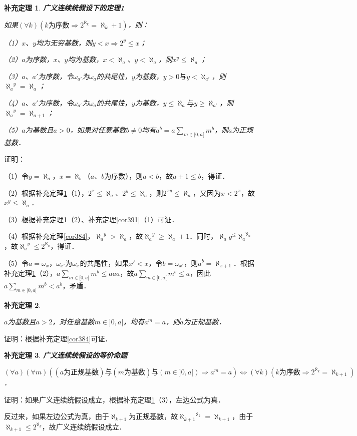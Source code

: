 \documentclass[12pt, a4paper, oneside]{book}
\newtheorem{cor}{补充定理}
\begin{document}
			\begin{cor}\label{cor392}
				\textbf{广义连续统假设下的定理1}
				\par
				如果$(\forall k)(k\text{为序数}\Rightarrow 2^{\aleph_k}=\aleph_k+1)$，则：
				\par
				（1）$x$、$y$均为无穷基数，则$y<x\Rightarrow 2^y\leq x$；
				\par
				（2）$a$为序数，$x$、$y$均为基数，$x<\aleph_a$、$y<\aleph_a$，则$x^y\leq \aleph_a$；
				\par
				（3）$a$、$a'$为序数，令$\omega_{a'}$为$\omega_a$的共尾性，$y$为基数，$y>0\text{与}y<\aleph_{a'}$，则${\aleph_a}^y=\aleph_a$；
				\par
				（4）$a$、$a'$为序数，令$\omega_{a'}$为$\omega_a$的共尾性，$y$为基数，$y\leq \aleph_a\text{与}y\geq \aleph_{a'}$，则${\aleph_a}^y=\aleph_{a+1}$；
				\par
				（5）$a$为基数且$a>0$，如果对任意基数$b\neq 0$均有$a^b=a\sum\limits_{m\in [0, a[}m^b$，则$a$为正规基数．
			\end{cor}
			证明：
			\par
			（1）令$y=\aleph_a$，$x=\aleph_b$（$a$、$b$为序数），则$a<b$，故$a+1\leq b$，得证．
			\par
			（2）根据补充定理\ref{cor392}（1），$2^x\leq \aleph_a$、$2^y\leq \aleph_a$，则$2^{xy}\leq \aleph_a$，又因为$x<2^x$，故$x^y\leq \aleph_a$．
			\par
			（3）根据补充定理\ref{cor392}（2）、补充定理\ref{cor391}（1）可证．
			\par
			（4）根据补充定理\ref{cor384}，${\aleph_a}^y>\aleph_a$，故${\aleph_a}^y\geq \aleph_a+1$．同时，$\aleph_ay^\leq {\aleph_a}^{\aleph_a}$，故${\aleph_a}^y\leq 2^{\aleph_a}$，得证．
			\par
			（5）令$a=\omega_x$，$\omega_{x'}$为$\omega_x$的共尾性，如果$x'<x$，令$b=\omega_{x'}$，则$a^b=\aleph_{x+1}$．根据补充定理\ref{cor392}（2），$a\sum\limits_{m\in [0, a[}m^b\leq aaa$，故$a\sum\limits_{m\in [0, a[}m^b\leq a$，因此$a\sum\limits_{m\in [0, a[}m^b<a^b$，矛盾．
			
			\begin{cor}\label{cor393}
				\hfill\par
				$a$为基数且$a>2$，对任意基数$m\in ]0, a[$，均有$a^m=a$，则$a$为正规基数．
			\end{cor}
			证明：根据补充定理\ref{cor384}可证．
			
			\begin{cor}\label{cor394}
				\textbf{广义连续统假设的等价命题}
				\par
				$(\forall a)(\forall m)((a\text{为正规基数})\text{与}(m\text{为基数})\text{与}(m\in ]0, a[)\Rightarrow a^m=a)\Leftrightarrow (\forall k)(k\text{为序数}\Rightarrow 2^{\aleph_k}=\aleph_{k+1})$．
			\end{cor}
			证明：如果广义连续统假设成立，根据补充定理\ref{cor392}（3），左边公式为真．
			\par
			反过来，如果左边公式为真，由于$\aleph_{k+1}$为正规基数，故${\aleph_{k+1}}^{\aleph_k}=\aleph_{k+1}$，由于$\aleph_{k+1}\leq 2^{\aleph_k}$，故广义连续统假设成立．
			
\end{document}
